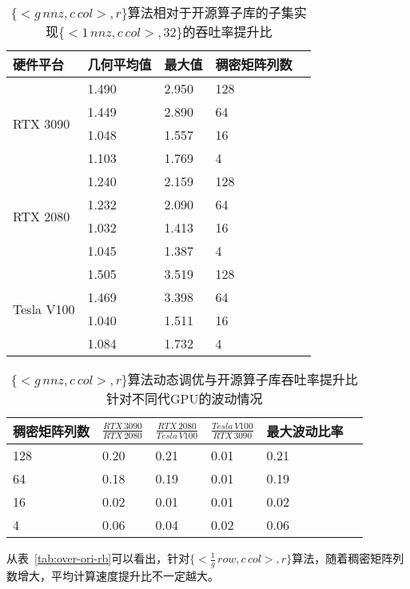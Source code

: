 \begin{table}
  \centering
  \caption{$\{<g\,nnz , c\,col>,r\}$算法相对于开源算子库的子集实现$\{<1\,nnz , c\,col>,32\}$的吞吐率提升比}
  \begin{tabular}{lllll}
  \toprule
  硬件平台 & 几何平均值  & 最大值 & 稠密矩阵列数 \\
  \midrule
  \multirow{4}{*}{RTX 3090}& 1.490  & 2.950  & 128\\
                          & 1.449   & 2.890  & 64\\
                          & 1.048   & 1.557  & 16\\
                          & 1.103   & 1.769 & 4\\
  \hline
  \multirow{4}{*}{RTX 2080}& 1.240   & 2.159  & 128\\
                          & 1.232   & 2.090  & 64\\
                          & 1.032   & 1.413  & 16\\
                          & 1.045   & 1.387  & 4\\
  \hline
  \multirow{4}{*}{Tesla V100}   & 1.505   & 3.519  & 128\\
                          & 1.469   & 3.398  & 64\\
                          & 1.040   & 1.511  & 16\\
                          & 1.084   & 1.732  & 4\\
  \bottomrule
  \end{tabular}
  \label{tab:over-ori-eb}%
\end{table}
\begin{table}
  \centering
  \caption{$\{<g\,nnz , c\,col>,r\}$算法动态调优与开源算子库吞吐率提升比针对不同代GPU的波动情况}
  \begin{tabular}{llllll}
  \toprule
  稠密矩阵列数 & $\frac{RTX\,3090}{RTX\,2080}$ & $\frac{RTX\,2080}{Tesla\,V100}$  & $\frac{Tesla\,V100}{RTX\,3090}$  & 最大波动比率 \\
  \midrule
  128 & 0.20 & 0.21 & 0.01 & 0.21 \\
  64  & 0.18 & 0.19 & 0.01 & 0.19 \\
  16  & 0.02 & 0.01 & 0.01 & 0.02 \\
  4   & 0.06 & 0.04 & 0.02 & 0.06 \\
  \bottomrule
  \end{tabular}
  \label{tab:hw-eb}
\end{table}
从表~\ref{tab:over-ori-rb}可以看出，针对$\{<\frac{1}{g}\,row , c\,col>,r\}$算法，随着稠密矩阵列数增大，平均计算速度提升比不一定越大。
